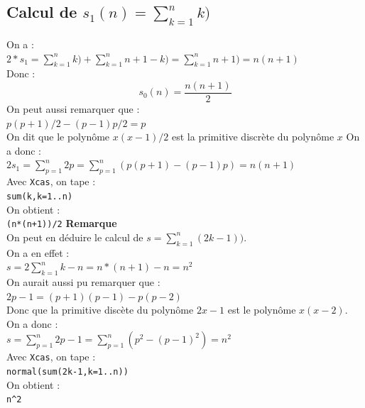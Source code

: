 \documentclass[a4paper,11pt]{book}
\begin{document}
\subsection{Calcul de $s_1(n)=\sum_{k=1}^nk)$}
On a :\\
$2*s_1=\sum_{k=1}^nk)+\sum_{k=1}^nn+1-k)=\sum_{k=1}^nn+1)=n(n+1)$\\
Donc :
$$s_0(n)=\frac{n(n+1)}{2}$$
On peut aussi remarquer que :\\
$p(p+1)/2-(p-1)p/2=p$\\
On dit que le polyn\^ome $x(x-1)/2$ est la primitive discr\`ete du polyn\^ome
$x$
On a donc :\\
$2s_1=\sum_{p=1}^n2p=\sum_{p=1}^n(p(p+1)-(p-1)p)=n(n+1)$\\
Avec {\tt Xcas}, on tape :\\
{\tt sum(k,k=1..n)}\\
On obtient :\\
{\tt (n*(n+1))/2}
{\bf Remarque}\\
On peut en d\'eduire le calcul de $s=\sum_{k=1}^n(2k-1))$.\\
On a en effet :\\
$s=2\sum_{k=1}^nk-n=n*(n+1)-n=n^2$\\
On aurait aussi pu remarquer que :\\
$2p-1=(p+1)(p-1)-p(p-2)$\\
Donc que la primitive disc\`ete du polyn\^ome
$2x-1$ est le polyn\^ome $x(x-2)$.\\
On a donc :\\
$s=\sum_{p=1}^n2p-1=\sum_{p=1}^n(p^2-(p-1)^2)=n^2$\\
Avec {\tt Xcas}, on tape :\\
{\tt normal(sum(2k-1,k=1..n))}\\
On obtient :\\
{\tt n\verb|^|2}
\end{document}
